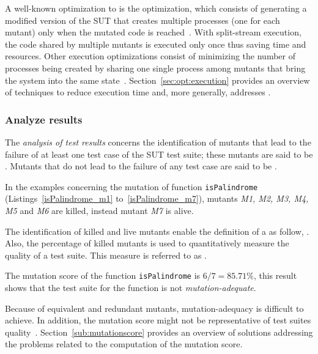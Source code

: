 A well-known optimization to  is the  optimization, which consists of generating a modified version of the SUT that creates multiple processes (one for each mutant) only when the mutated code is reached~\cite{tokumoto2016muvm}. With split-stream execution, the code shared by multiple mutants is executed only once thus saving time and resources. Other execution optimizations consist of minimizing the number of processes being created by sharing one single process among mutants that bring the system into the same state~\cite{wang2017faster}.
Section~\ref{sec:opt:execution} provides an overview of techniques to reduce execution time and, more generally, addresses .

\subsubsection{Analyze results}

The \emph{analysis of test results} concerns the identification of mutants that lead to the failure of at least one test case of the SUT test suite; these mutants are said to be . Mutants that do not lead to the failure of any test case are said to be . 

In the examples concerning the mutation of function \texttt{isPalindrome} (Listings~\ref{isPalindrome_m1} to~\ref{isPalindrome_m7}), mutants \textit{M1, M2, M3, M4, M5} and \textit{M6} are killed, instead mutant \textit{M7} is alive.

The identification of killed and live mutants enable the definition of a  as follow, . 
Also, the percentage of killed mutants is used to quantitatively measure the quality of a test suite. This measure is referred to as .


The mutation score of the function \texttt{isPalindrome} is $6/7 = 85.71\%$, this result shows that the test suite for the function is not \textit{mutation-adequate}.

Because of equivalent and redundant mutants, mutation-adequacy is difficult to achieve. In addition, the mutation score might not be representative of test suites quality~\cite{papadakis2016threats}. Section~\ref{sub:mutationscore} provides an overview of solutions addressing the problems related to the computation of the mutation score.



